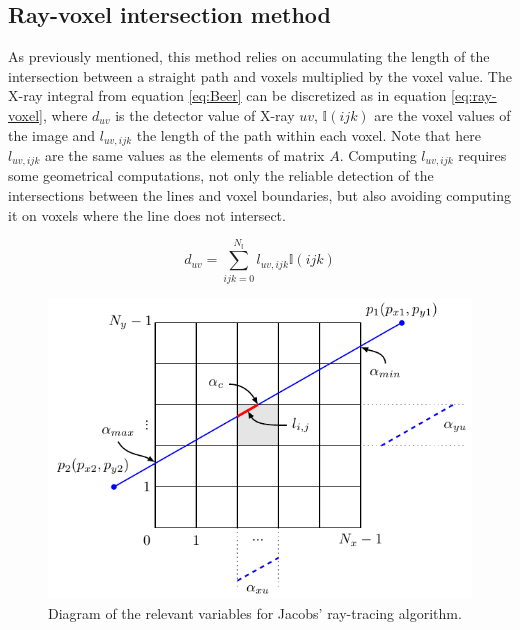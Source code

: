 \FloatBarrier

\subsection{Ray-voxel intersection method}

As previously mentioned, this method relies on accumulating the length of the intersection between a straight path and voxels multiplied by the voxel value. The X-ray integral from equation \ref{eq:Beer} can be discretized as in equation \ref{eq:ray-voxel}, where $d_{uv}$ is the detector value of X-ray $uv$, $\mathbb{I}(ijk)$ are the voxel values of the image and $l_{uv,ijk}$ the length of the path within each voxel. Note that here $l_{uv,ijk}$ are the same values as the elements of matrix $A$. Computing $l_{uv,ijk}$ requires some geometrical computations, not only the reliable detection of the intersections between the lines and voxel boundaries, but also avoiding computing it on voxels where the line does not intersect.

\begin{equation}
d_{uv}= \sum_{ijk=0}^{N_\mathbb{I}}l_{uv,ijk}\mathbb{I}(ijk)
\label{eq:ray-voxel}
\end{equation}


\begin{figure}
\begin{center}

\includegraphics{GPUmethods/Amatrix_siddon_diagram.pdf} 
\end{center}

\caption[Jacob's ray tracing diagram]{\label{fig:Siddon} Diagram of the relevant variables for Jacobs' ray-tracing algorithm.} 
\end{figure}



